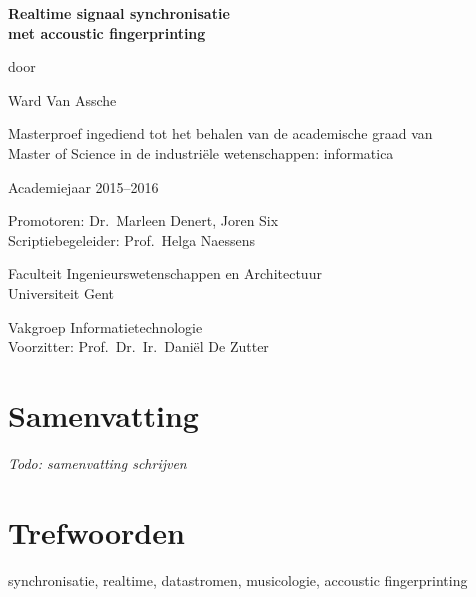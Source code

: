 
\newpage

{
\setlength{\baselineskip}{14pt}
\setlength{\parindent}{0pt}
\setlength{\parskip}{8pt}

\begin{center}

\noindent \textbf{\huge
Realtime signaal synchronisatie\\[8pt]
met accoustic fingerprinting
}

door 

Ward Van Assche

Masterproef ingediend tot het behalen van de academische graad van\\
Master of Science in de industriële wetenschappen: informatica

Academiejaar 2015--2016

Promotoren: Dr.~Marleen Denert, Joren Six\\
Scriptiebegeleider: Prof.~Helga Naessens

Faculteit Ingenieurswetenschappen en Architectuur\\
Universiteit Gent

Vakgroep Informatietechnologie\\
Voorzitter: Prof.~Dr.~Ir.~Dani\"{e}l De Zutter


\end{center}

\section*{Samenvatting}


\textit{Todo: samenvatting schrijven}




\section*{Trefwoorden}


synchronisatie, realtime, datastromen, musicologie, accoustic fingerprinting

}
\newpage %
